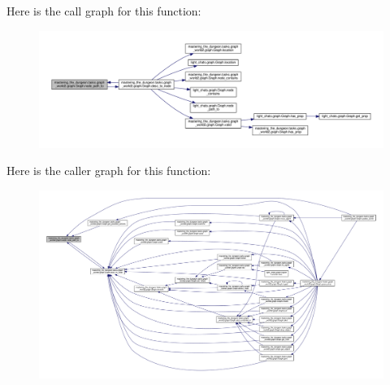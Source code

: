 Here is the call graph for this function\+:
\nopagebreak
\begin{figure}[H]
\begin{center}
\leavevmode
\includegraphics[width=350pt]{classmastering__the__dungeon_1_1tasks_1_1graph__world2_1_1graph_1_1Graph_a289dcd73f6496ab0f16ed1d76cfe797b_cgraph}
\end{center}
\end{figure}
Here is the caller graph for this function\+:
\nopagebreak
\begin{figure}[H]
\begin{center}
\leavevmode
\includegraphics[width=350pt]{classmastering__the__dungeon_1_1tasks_1_1graph__world2_1_1graph_1_1Graph_a289dcd73f6496ab0f16ed1d76cfe797b_icgraph}
\end{center}
\end{figure}
\mbox{\label{classmastering__the__dungeon_1_1tasks_1_1graph__world2_1_1graph_1_1Graph_adc2e8672dfe5637ef7f2bd5a2d9c9083}} 
